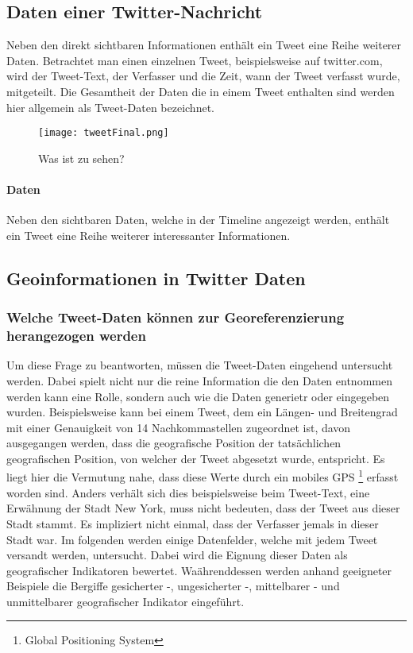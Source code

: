 		\subsection{Daten einer Twitter-Nachricht}
			Neben den direkt sichtbaren Informationen enthält ein Tweet eine Reihe weiterer Daten.
			Betrachtet man einen einzelnen Tweet, beispielsweise auf twitter.com, wird der Tweet-Text, der Verfasser und die Zeit, wann der Tweet verfasst wurde, mitgeteilt.  
			Die Gesamtheit der Daten die in einem Tweet enthalten sind werden hier allgemein als Tweet-Daten bezeichnet.

			\begin{figure}[h!]
			\begin{center}
			\texttt{[image: tweetFinal.png]}
			\caption{Was ist zu sehen?}
			\label{tweet}
			\end{center}
			\end{figure}	


		 	\paragraph{Daten}
		 		Neben den sichtbaren Daten, welche in der Timeline angezeigt werden, enthält ein Tweet eine Reihe weiterer interessanter Informationen. 	


	 	\subsection{Geoinformationen in Twitter Daten}

	 		\subsubsection{Welche Tweet-Daten können zur Georeferenzierung herangezogen werden}  

				Um diese Frage zu beantworten, müssen die Tweet-Daten eingehend untersucht werden. 
				Dabei spielt nicht nur die reine Information die den Daten entnommen werden kann eine Rolle, sondern auch wie die Daten generietr oder eingegeben wurden.
				Beispielsweise kann bei einem Tweet, dem ein Längen- und Breitengrad mit einer Genauigkeit von 14 Nachkommastellen zugeordnet ist, davon ausgegangen werden, dass die geografische Position der tatsächlichen geografischen Position, von welcher der Tweet abgesetzt wurde, entspricht. 
				Es liegt hier die Vermutung nahe, dass diese Werte durch ein mobiles GPS \footnote{Global Positioning System} erfasst worden sind. 
				Anders verhält sich dies beispielsweise beim Tweet-Text, eine Erwähnung der Stadt New York, muss nicht bedeuten, dass der Tweet aus dieser Stadt stammt. 
				Es impliziert nicht einmal, dass der Verfasser jemals in dieser Stadt war.  
				Im folgenden werden einige Datenfelder, welche mit jedem Tweet versandt werden, untersucht.
				Dabei wird die Eignung dieser Daten als geografischer Indikatoren bewertet.
				Waährenddessen werden anhand geeigneter Beispiele die Bergiffe gesicherter -, ungesicherter -, mittelbarer - und unmittelbarer geografischer Indikator eingeführt.  


